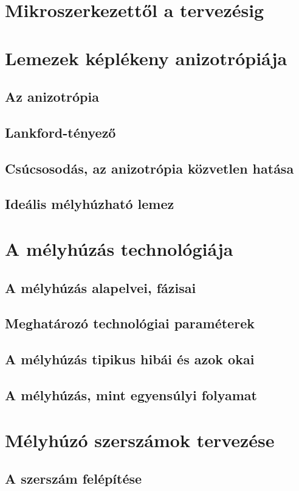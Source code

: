 \documentclass[12pt,a4paper,oneside]{report}
\begin{document}
\section{Mikroszerkezettől a tervezésig}

\section{Lemezek képlékeny anizotrópiája}
\subsection{Az anizotrópia}
\subsection{Lankford-tényező}
\subsection{Csúcsosodás, az anizotrópia közvetlen hatása}
\subsection{Ideális mélyhúzható lemez}

\section{A mélyhúzás technológiája}
\subsection{A mélyhúzás alapelvei, fázisai}
\subsection{Meghatározó technológiai paraméterek}
\subsection{A mélyhúzás tipikus hibái és azok okai}
\subsection{A mélyhúzás, mint egyensúlyi folyamat}

\section{Mélyhúzó szerszámok tervezése}
\subsection{A szerszám felépítése}
\end{document}
